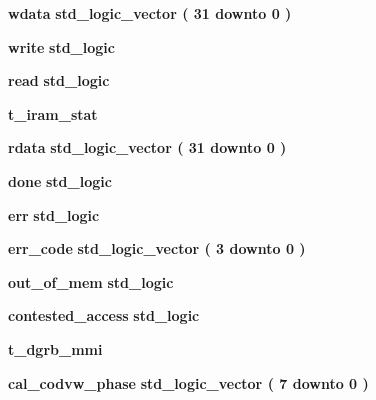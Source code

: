 \begin{DoxyCompactItemize}
\item 
{\bf wdata} {\bfseries {\bfseries \textcolor{comment}{std\+\_\+logic\+\_\+vector}\textcolor{vhdlchar}{ }\textcolor{vhdlchar}{(}\textcolor{vhdlchar}{ }\textcolor{vhdlchar}{ } \textcolor{vhdldigit}{31} \textcolor{vhdlchar}{ }\textcolor{keywordflow}{downto}\textcolor{vhdlchar}{ }\textcolor{vhdlchar}{ } \textcolor{vhdldigit}{0} \textcolor{vhdlchar}{ }\textcolor{vhdlchar}{)}\textcolor{vhdlchar}{ }}} 
\item 
{\bf write} {\bfseries {\bfseries \textcolor{comment}{std\+\_\+logic}\textcolor{vhdlchar}{ }}} 
\item 
{\bf read} {\bfseries {\bfseries \textcolor{comment}{std\+\_\+logic}\textcolor{vhdlchar}{ }}} 
\item 
{\bf t\+\_\+iram\+\_\+stat} {\bfseries  }
\item 
{\bf rdata} {\bfseries {\bfseries \textcolor{comment}{std\+\_\+logic\+\_\+vector}\textcolor{vhdlchar}{ }\textcolor{vhdlchar}{(}\textcolor{vhdlchar}{ }\textcolor{vhdlchar}{ } \textcolor{vhdldigit}{31} \textcolor{vhdlchar}{ }\textcolor{keywordflow}{downto}\textcolor{vhdlchar}{ }\textcolor{vhdlchar}{ } \textcolor{vhdldigit}{0} \textcolor{vhdlchar}{ }\textcolor{vhdlchar}{)}\textcolor{vhdlchar}{ }}} 
\item 
{\bf done} {\bfseries {\bfseries \textcolor{comment}{std\+\_\+logic}\textcolor{vhdlchar}{ }}} 
\item 
{\bf err} {\bfseries {\bfseries \textcolor{comment}{std\+\_\+logic}\textcolor{vhdlchar}{ }}} 
\item 
{\bf err\+\_\+code} {\bfseries {\bfseries \textcolor{comment}{std\+\_\+logic\+\_\+vector}\textcolor{vhdlchar}{ }\textcolor{vhdlchar}{(}\textcolor{vhdlchar}{ }\textcolor{vhdlchar}{ } \textcolor{vhdldigit}{3} \textcolor{vhdlchar}{ }\textcolor{keywordflow}{downto}\textcolor{vhdlchar}{ }\textcolor{vhdlchar}{ } \textcolor{vhdldigit}{0} \textcolor{vhdlchar}{ }\textcolor{vhdlchar}{)}\textcolor{vhdlchar}{ }}} 
\item 
{\bf out\+\_\+of\+\_\+mem} {\bfseries {\bfseries \textcolor{comment}{std\+\_\+logic}\textcolor{vhdlchar}{ }}} 
\item 
{\bf contested\+\_\+access} {\bfseries {\bfseries \textcolor{comment}{std\+\_\+logic}\textcolor{vhdlchar}{ }}} 
\item 
{\bf t\+\_\+dgrb\+\_\+mmi} {\bfseries  }
\item 
{\bf cal\+\_\+codvw\+\_\+phase} {\bfseries {\bfseries \textcolor{comment}{std\+\_\+logic\+\_\+vector}\textcolor{vhdlchar}{ }\textcolor{vhdlchar}{(}\textcolor{vhdlchar}{ }\textcolor{vhdlchar}{ } \textcolor{vhdldigit}{7} \textcolor{vhdlchar}{ }\textcolor{keywordflow}{downto}\textcolor{vhdlchar}{ }\textcolor{vhdlchar}{ } \textcolor{vhdldigit}{0} \textcolor{vhdlchar}{ }\textcolor{vhdlchar}{)}\textcolor{vhdlchar}{ }}} 

\end{DoxyCompactItemize}
